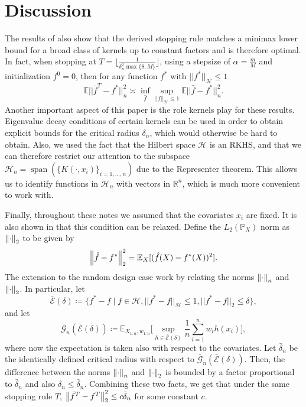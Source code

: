 \section{Discussion}
The results of \cite{wain17ada} also show that the derived stopping rule matches a minimax lower bound for a broad class of kernels up to constant factors and is therefore optimal. In fact, when stopping at $T=\lfloor \frac{1}{\delta_n^2 \max\{8,M\}}\rfloor$, using a stepsize of $\alpha=\frac{m}{M}$ and initialization $f^0=0$, then for any function $f^*$ with $||f^*||_{\mathcal{H}}\le 1$
\begin{equation}
\mathbb{E}||\bar{f}^T-f^*||_n^2 \asymp \inf_{\hat{f}}\sup_{||f||_{\mathcal{H}}\le 1} \mathbb{E}||\hat{f}-f^*||_n^2.
\end{equation}
Another important aspect of this paper is the role kernels play for these results.
Eigenvalue decay conditions of certain kernels can be used in order to obtain explicit bounds for the critical radius $\delta_n$, which would otherwise be hard to obtain.
Also, we used the fact that the Hilbert space $\mathcal{H}$ is an RKHS, and that we can therefore restrict our attention to the subspace $\mathcal{H}_n = \operatorname{span}(\{K(\cdot, x_i)\}_{i=1,\dots,n})$ due to the Representer theorem. This allows us to identify functions in $\mathcal{H}_n$ with vectors in $\mathbb{R}^n$, which is much more convenient to work with.

Finally, throughout these notes we assumed that the covariates $x_{i}$ are fixed.
It is also shown in \cite{wain17ada} that this condition can be relaxed.
Define the $L_{2}(\mathbb{P}_{X})$ norm as $\left\lVert\cdot\right\rVert_{2}$ to be given by
$$
\left\lVert\hat{f} - f^{*}\right\rVert_{2}^{2} = \mathbb{E}_{X}[(\hat{f}(X) - f^{*}(X))^{2}].
$$
The extension to the random design case work by relating the norms
$\left\lVert\cdot\right\rVert_{n}$
and $\left\lVert\cdot\right\rVert_{2}$.
In particular, let
$$
\bar{\mathcal{E}}(\delta) \coloneqq \{f^{*}-f \mid f\in\mathcal{H}, ||f^{*}-f||_{\mathcal{H}}\le 1, ||f^{*}-f||_2 \leq \delta\},
$$
and let
\begin{equation}
\bar{\mathcal{G}}_{n}(\bar{\mathcal{E}}(\delta)) \coloneqq
\mathbb{E}_{X_{1:n}, w_{1:n}}\Big[\sup_{h\in\bar{\mathcal{E}}(\delta)}\frac{1}{n}\sum_{i=1}^nw_ih(x_i)\Big],
\end{equation}
where now the expectation is taken also with respect to the covariates.
Let $\bar{\delta}_{n}$ be the identically defined critical radius with respect to
$\bar{\mathcal{G}}_{n}(\bar{\mathcal{E}}(\delta))$.
Then, the difference between the norms
$\left\lVert\cdot\right\rVert_{n}$
and $\left\lVert\cdot\right\rVert_{2}$ is bounded by a factor proportional to $\bar{\delta}_{n}$
and also $\delta_{n} \leq \bar{\delta}_{n}$. Combining these two facts, we get that
under the same stopping rule $T$, $\left\lVert\bar{f}^{T} - f^{T}\right\rVert_{2}^{2} \leq c \bar{\delta}_{n}$
for some constant $c$.

